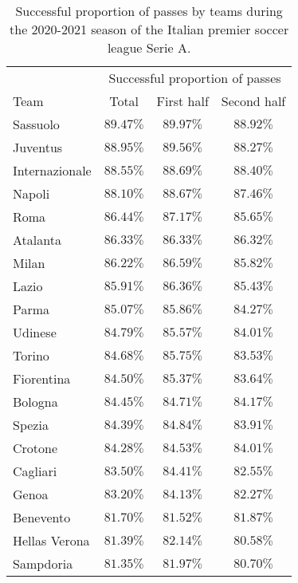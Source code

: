 \begin{table}[!htbp]
    \centering
    \begin{tabular}{l|c c c}
          & \multicolumn{3}{c}{Successful proportion of passes}  \\
        Team & Total & First half & Second half \\
        \hline
Sassuolo& $89.47\%$ & $89.97\%$ & $88.92\%$ \\
Juventus&$88.95\%$ & $89.56\%$ & $88.27\%$ \\
Internazionale& $88.55\%$ & $88.69\%$ & $88.40\%$ \\
Napoli& $88.10\%$ & $88.67\%$ & $87.46\%$ \\
Roma& $86.44\%$ & $87.17\%$ & $85.65\%$ \\
Atalanta& $86.33\%$ & $86.33\%$ & $86.32\%$ \\
Milan & $86.22\%$ & $86.59\%$ & $85.82\%$ \\
Lazio & $85.91\%$ & $86.36\%$ & $85.43\%$ \\
Parma & $85.07\%$ & $85.86\%$ & $84.27\%$ \\
Udinese & $84.79\%$ & $85.57\%$ & $84.01\%$ \\
Torino & $84.68\%$ & $85.75\%$ & $83.53\%$ \\
Fiorentina & $84.50\%$ & $85.37\%$ & $83.64\%$ \\
Bologna & $84.45\%$ & $84.71\%$ & $84.17\%$ \\
Spezia & $84.39\%$ & $84.84\%$ & $83.91\%$ \\
Crotone & $84.28\%$ & $84.53\%$ & $84.01\%$ \\
Cagliari & $83.50\%$ & $84.41\%$ & $82.55\%$ \\
Genoa & $83.20\%$ & $84.13\%$ & $82.27\%$ \\
Benevento & $81.70\%$ & $81.52\%$ & $81.87\%$ \\
Hellas Verona & $81.39\%$ & $82.14\%$ & $80.58\%$ \\
Sampdoria & $81.35\%$ & $81.97\%$ & $80.70\%$ \\
    \end{tabular}
    \caption{Successful proportion of passes by teams during the 2020-2021 season of the Italian premier soccer league Serie A.}
    \label{tab:totalPass}
\end{table}
